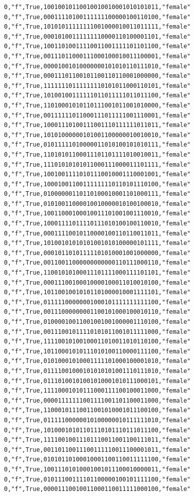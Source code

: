 \documentclass[authoryearcitations]{UoYCSproject}
\begin{document}
\begin{framed}
\begin{verbatim}
0,"f",True,10010010110010010010001010101011,"female"
0,"f",True,00011110100111111100000100110100,"female"
0,"f",True,10101011111111001000010011011111,"female"
0,"f",True,00010100111111110000110100001101,"female"
0,"f",True,10011010011110011001111101101100,"female"
0,"f",True,00111011000111000100010011100001,"female"
0,"f",True,00001001010000000101010110111010,"female"
0,"f",True,00011101100101100110110001000000,"female"
0,"f",True,11111110111111110101011000110101,"female"
0,"f",True,10100100111111011011111011011100,"female"
0,"f",True,11010001010110111001011001010000,"female"
0,"f",True,00111111011000111011111001110001,"female"
0,"f",True,10001110100111001110111111011011,"female"
0,"f",True,10101000000101001100000010010010,"female"
0,"f",True,01011111010000011010100101010111,"female"
0,"f",True,11010101100011101101111010010011,"female"
0,"f",True,11101010101011000111000011101111,"female"
0,"f",True,10010011110101110010001110001001,"female"
0,"f",True,10001001100111111110110101110100,"female"
0,"f",True,01000000110110100010001101000111,"female"
0,"f",True,01010011000010010000010100100010,"female"
0,"f",True,10011000100010011101001001110010,"female"
0,"f",True,10001111011110111010100100110010,"female"
0,"f",True,00011110010110000100110110011011,"female"
0,"f",True,10100101010101001010100000101111,"female"
0,"f",True,00010110101111101010001001000000,"female"
0,"f",True,00110011000000000000110111000110,"female"
0,"f",True,11001010100011101111000111101101,"female"
0,"f",True,00011100100010000100011010010100,"female"
0,"f",True,10110010010101101000010001111101,"female"
0,"f",True,01111100000001000101111111111100,"female"
0,"f",True,00111000000001100101000100010110,"female"
0,"f",True,01000010011001001001000001110100,"female"
0,"f",True,00111001011110101011001011111000,"female"
0,"f",True,11110010100100011010011010110100,"female"
0,"f",True,10110001010111010100110000111100,"female"
0,"f",True,01010001010001111101000100001010,"female"
0,"f",True,01111001000101010101001110111010,"female"
0,"f",True,01110100101001010001010111000101,"female"
0,"f",True,11110001010111000111100100011000,"female"
0,"f",True,00001111111001111001101100011000,"female"
0,"f",True,11000101110011001010001011100100,"female"
0,"f",True,01111100000010100000010111111010,"female"
0,"f",True,10100010101101110101110111011100,"female"
0,"f",True,11110010011101110011001100111011,"female"
0,"f",True,00110110011100111110011100001011,"female"
0,"f",True,01010110100010001100110011111100,"female"
0,"f",True,10011101010001001011100010000011,"female"
0,"f",True,01011100111101100000100101111100,"female"
0,"f",True,00001110010011000110011111000100,"female"

\end{verbatim}
\end{framed}
\end{document}
